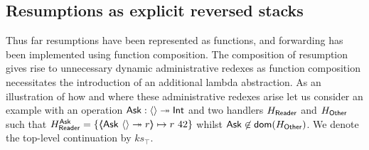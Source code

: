 \documentclass[12pt,phd,lfcs,twoside,openright,logo,leftchapter,normalheadings]{infthesis}
\theoremstyle{plain}
\theoremstyle{definition}
\begin{document}
\subsection{Resumptions as explicit reversed stacks}
\label{sec:first-order-explicit-resump}
%
%
Thus far resumptions have been represented as functions, and
forwarding has been implemented using function composition. The
composition of resumption gives rise to unnecessary dynamic
administrative redexes as function composition necessitates the
introduction of an additional lambda abstraction.
%
As an illustration of how and where these administrative redexes arise
let us consider an example with an operation $\mathsf{Ask} : \langle  \rangle \twoheadrightarrow \mathsf{Int}$
and two handlers $H_{\mathsf{Reader}}$ and $H_{\mathsf{Other}}$ such that
$H_{\mathsf{Reader}}^{\mathsf{Ask}} = \{\langle\!\!\langle \mathsf{Ask}~\langle  \rangle \twoheadrightarrow r \rangle\!\!\rangle \mapsto r~42\}$ whilst
$\mathsf{Ask} \not\in \mathsf{dom}(H_{\mathsf{Other}})$. We denote the top-level continuation by
$ks_\top$.
%
%
\end{document}
